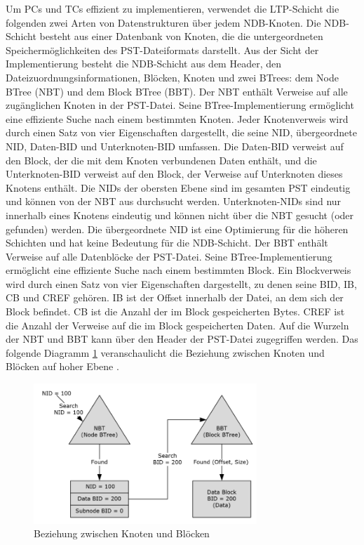 \noindent Um PCs und TCs effizient zu implementieren, verwendet die LTP-Schicht die folgenden zwei Arten von Datenstrukturen über jedem NDB-Knoten. Die NDB-Schicht besteht aus einer Datenbank von Knoten, die die untergeordneten Speichermöglichkeiten des PST-Dateiformats darstellt. Aus der Sicht der Implementierung besteht die NDB-Schicht aus dem Header, den Dateizuordnungsinformationen, Blöcken, Knoten und zwei BTrees: dem Node BTree (NBT) und dem Block BTree (BBT). Der NBT enthält Verweise auf alle zugänglichen Knoten in der PST-Datei. Seine BTree-Implementierung ermöglicht eine effiziente Suche nach einem bestimmten Knoten. Jeder Knotenverweis wird durch einen Satz von vier Eigenschaften dargestellt, die seine NID, übergeordnete NID, Daten-BID und Unterknoten-BID umfassen. Die Daten-BID verweist auf den Block, der die mit dem Knoten verbundenen Daten enthält, und die Unterknoten-BID verweist auf den Block, der Verweise auf Unterknoten dieses Knotens enthält. Die NIDs der obersten Ebene sind im gesamten PST eindeutig und können von der NBT aus durchsucht werden. Unterknoten-NIDs sind nur innerhalb eines Knotens eindeutig und können nicht über die NBT gesucht (oder gefunden) werden. Die übergeordnete NID ist eine Optimierung für die höheren Schichten und hat keine Bedeutung für die NDB-Schicht. Der BBT enthält Verweise auf alle Datenblöcke der PST-Datei. Seine BTree-Implementierung ermöglicht eine effiziente Suche nach einem bestimmten Block. Ein Blockverweis wird durch einen Satz von vier Eigenschaften dargestellt, zu denen seine BID, IB, CB und CREF gehören. IB ist der Offset innerhalb der Datei, an dem sich der Block befindet. CB ist die Anzahl der im Block gespeicherten Bytes. CREF ist die Anzahl der Verweise auf die im Block gespeicherten Daten. Auf die Wurzeln der NBT und BBT kann über den Header der PST-Datei zugegriffen werden.
Das folgende Diagramm \ref{fig:nodesblockspst} veranschaulicht die Beziehung zwischen Knoten und Blöcken auf hoher Ebene \cite{.c}.

\begin{figure}[!ht]
    \centering
    \includegraphics[width=0.75\textwidth]{images/nodes_blocks_pst.PNG}
    \caption{Beziehung zwischen Knoten und Blöcken \cite{.c}} 
    \label{fig:nodesblockspst}
\end{figure}